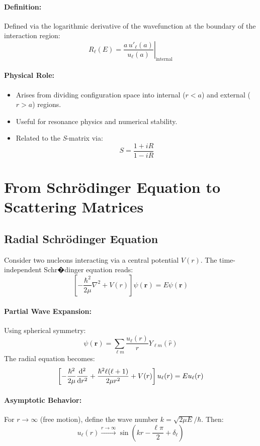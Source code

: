 \documentclass[10pt,a4paper]{article}
\newcommand{\ve}[1]{\mathbf{#1}}
\begin{document}
	\paragraph{Definition:}
	Defined via the logarithmic derivative of the wavefunction at the boundary of the interaction region:
	\[
	R_\ell(E) = \left. \frac{a\, u'_\ell(a)}{u_\ell(a)} \right|_{\text{internal}}
	\]
	
	\paragraph{Physical Role:}
	\begin{itemize}
		\item Arises from dividing configuration space into internal (\( r < a \)) and external (\( r > a \)) regions.
		\item Useful for resonance physics and numerical stability.
		\item Related to the \textit{S}-matrix via:
		\[
		S = \frac{1 + iR}{1 - iR}
		\]
	\end{itemize}
	
	\section{From Schr\"odinger Equation to Scattering Matrices}
	
	\subsection{Radial Schr\"odinger Equation}
	
	Consider two nucleons interacting via a central potential \( V(r) \). The time-independent Schr�dinger equation reads:
	\[
	\left[ -\frac{\hbar^2}{2\mu} \nabla^2 + V(r) \right] \psi(\ve{r}) = E \psi(\ve{r})
	\]
	
	\paragraph{Partial Wave Expansion:}
	Using spherical symmetry:
	\[
	\psi(\ve{r}) = \sum_{\ell m} \frac{u_\ell(r)}{r} Y_{\ell m}(\hat{r})
	\]
	The radial equation becomes:
	\[
	\left[-\frac{\hbar^2}{2\mu} \dv[2]{r} + \frac{\hbar^2 \ell(\ell+1)}{2\mu r^2} + V(r) \right] u_\ell(r) = E u_\ell(r)
	\]
	
	\paragraph{Asymptotic Behavior:}
	For \( r \to \infty \) (free motion), define the wave number \( k = \sqrt{2\mu E}/\hbar \). Then:
	\[
	u_\ell(r) \xrightarrow{r \to \infty} \sin\left(kr - \frac{\ell\pi}{2} + \delta_\ell\right)
	\]
	
\end{document}
